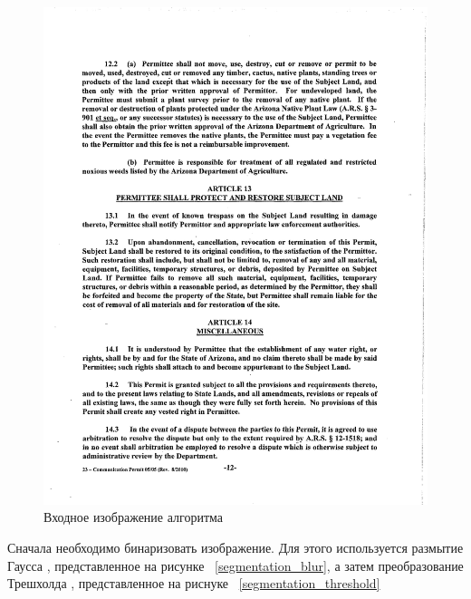 \begin{figure}
    \includegraphics[scale=0.5]{img/paragraph/input.png}
    \caption{Входное изображение алгоритма}
    \label{segmentation_input}
\end{figure}

Сначала необходимо бинаризовать изображение. Для этого используется размытие Гаусса \cite{gauss_blur}, представленное на рисунке ~\ref{segmentation_blur}, а затем преобразование Трешхолда \cite{opencv_threshold}, представленное на риснуке ~\ref{segmentation_threshold}

